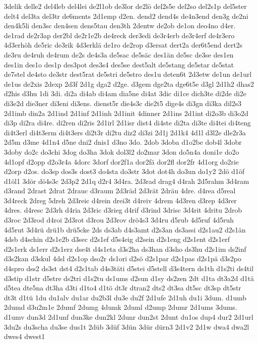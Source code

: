 {3delik
delle2
del4leb
del4lei
de2l1ob
de3lor
de2lö
del2s5e
del2so
del2s1p
del5ster
delt4
del3ta
del3tr
de6ments
2d1emp
d2en.
dend2
dend4s
de4n3end
den3g
de2ni
den4k5li
den3sc
den4sen
dens5tau
den3th
2dentw
de2ob
de1on
deo4no
d4er.
de1rad
de2r3ap
der2bl
de2r1e2b
de4reck
der3edi
de3r4erb
de3r4erf
de4r3ero
4d3erhöh
de5ric
de3rik
4d3erklä
de1ro
de2rop
d3ersat
dert2a
der6t5end
dert2s
de3ru
de4ruh
de4rum
de2s
de4s3a
de5sac
de5säc
des1än
de5sc
de3se
des1en
des1in
des1o
des1p
des3pot
des3s4
des5se
dest5alt
de5stang
de5star
de5stat
de7stel
de4sto
de3str
dest5rat
de5stri
de5stro
des1u
deten6t
2d3etw
de1un
de1url
de1us
de2xis
2dexp
2d3f
2d1g
dga2
d2ge.
d3gem
dge2ta
dge6t5e
d3gl
2d1h2
dhas2
d2his
d3hu
1di
3di.
di2a
di4ab
di4am
dia5ne
di4at
3dic
di1ce
dich3te
di2de
di2e
di3e2d
die3ner
di3eni
di3ens.
dienst5r
die4s3c
die2t5
dige4s
di3gn
di3ka
dil2s3
2d1imb
din2a
2d1ind
2d1inf
2d1inh
2d1init
4dinner
2d1ins
2d1int
di2o3b
di3o2d
di3p
di2ra
di4re.
di2ren
di2ris
2d1irl
2d1isr
dist4
di4ste
di2ta
di3te
di4tei
di4teng
di4t3erl
di4t3erm
di4t3ers
di2t3r
di2tu
diz2
di3zi
2d1j
2d1k4
4d1l
d3l2e
dle2r3a
2d5m
d3me
4d1n4
d5ne
dni2
dnis1
d3no
3do.
2dob
3doba
d1o2be
dob4l
3dobr
3doby
do2c
do3chi
3dog
do3ha
3dok
dol3l2
do2mar
3don
do5n4a
doni1e
do2o
4d1opf
d2opp
d2o3r4a
4dorc
3dorf
dor2f1a
dor2fä
dor2fl
dor2fr
4d1org
do2rie
d2orp
d2os.
do3sp
dos3s
dost3
do4sta
do3str
3dot
dot4h
do3un
do1y2
2dö
d1öf
d1öl1
3dör
dö4s3c
2d3p2
2d1q
d2r4
3d4ra.
2d3rad
drag4
d4rah
2d5rahm
3d4ram
d3rand
2drast
2drat
2drauc
d3raum
2d3räd
2d3rät
2dräu
4dre.
d4rea
d5real
3d4reck
2dreg
5dreh
2d3reic
d4rein
drei3t
d4reiv
4drem
4d3ren
d3rep
4d3rer
4dres.
d4resc
2d3rh
d4ria
2d3ric
d3rieg
d4rif
d3rind
3drisc
3d4rit
4dritu
2drob
d3roc
2d3rod
d4roi
2d3rot
d3rou
2d3rov
drö4s3
3d4ru
d5rub
4d5ruf
4d5ruh
4d5rut
3d4rü
drü1b
drü5cke
2ds
ds3ab
d4s3amt
d2s3an
ds3assi
d2s1au2
d2s1än
4dsb
d4schin
d2s1e2b
d3sec
d2s1ef
d5s4eig
d2sein
d2s1eng
d2s1ent
d2s1erf
d2s1erk
ds1err
d2s1erz
dse4t
d4s1eta
d3s2ha
ds3han
d3sho
ds3hu
d2s1im
ds2inf
d3s2kan
d3skul
4dsl
d2s1op
dso2r
ds1ori
d2sö
d2s1par
d2s1pas
d2s1pä
d3s2po
d4spro
dss2
ds3st
dst4
d2s1tab
d4s3täti
d5stei
d5stell
d3s4tern
ds1th
d1s2ti
ds4til
d3stip
d1str
d5stre
ds2tri
d1s2tu
ds1ums
d2sun
d1sy
ds2zen
2dt
d1ta
dt3a2d
d1tä
d5tea
dte5na
dt3ha
d3ti
d1to4
d1tö
dt3r
dtran2
dts2
dt3sa
dt5sc
dt3sp
dt5str
dt3t
d1tü
1du
du1alv
du1ar
du2b3l
du3e
du2f
2d1ufe
2d1uh
du1i
3dum.
d1umb
2dumd
d3u2m1e
2dumf
2dumg
4dumk
2duml
d2ump
2dumr
2d1ums
3dums.
d1umv
dun3d
2d1unf
dun3ke
dun2kl
2dunr
dun2st
2dunt
du1os
dup4
dur2
2d1url
3du2s
du3scha
du3se
dus1t
2düb
3düf
3dün
3dür
dürn3
2d1v2
2d1w
dwa4
dwa2l
dwes4
dwest1
}
